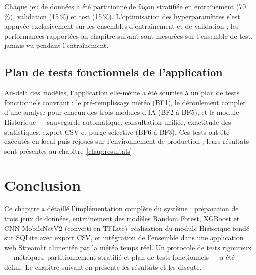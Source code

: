Chaque jeu de données a été partitionné de façon stratifiée en
entraînement (70\,\%), validation (15\,\%) et test (15\,\%).
L'optimisation des hyperparamètres s'est appuyée exclusivement
sur les ensembles d'entraînement et de validation ; les
performances rapportées au chapitre suivant sont mesurées sur
l'ensemble de test, jamais vu pendant l'entraînement.

\subsection{Plan de tests fonctionnels de l'application}

Au-delà des modèles, l'application elle-même a été soumise à un
plan de tests fonctionnels couvrant : le pré-remplissage météo
(BF1), le déroulement complet d'une analyse pour chacun des
trois modules d'IA (BF2 à BF5), et le module Historique ---
sauvegarde automatique, consultation unifiée, exactitude des
statistiques, export CSV et purge sélective (BF6 à BF8). Ces
tests ont été exécutés en local puis rejoués sur l'environnement
de production ; leurs résultats sont présentés au
chapitre~\ref{chap:resultats}.

\section*{Conclusion}

Ce chapitre a détaillé l'implémentation complète du système :
préparation de trois jeux de données, entraînement des modèles
Random Forest, XGBoost et CNN MobileNetV2 (converti en TFLite),
réalisation du module Historique fondé sur SQLite avec export
CSV, et intégration de l'ensemble dans une application web
Streamlit alimentée par la météo temps réel. Un protocole de
tests rigoureux --- métriques, partitionnement stratifié et plan
de tests fonctionnels --- a été défini. Le chapitre suivant en
présente les résultats et les discute.